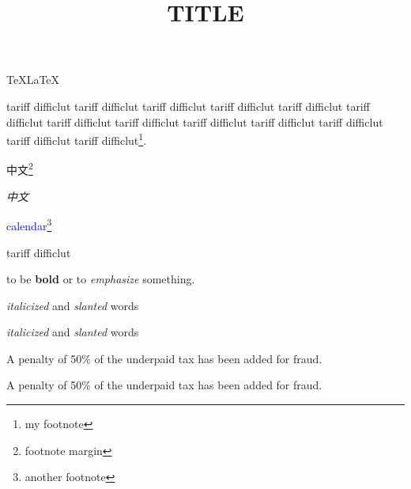 ﻿\documentclass[a4paper]{article}
\title{TITLE}
\author{}
\date{}
\begin{document}
\TeX \LaTeX

tariff difficlut tariff difficlut tariff difficlut tariff difficlut tariff difficlut tariff
difficlut tariff difficlut tariff difficlut tariff difficlut tariff difficlut tariff difficlut
tariff difficlut tariff difficlut\footnote{my footnote}.

中文\footnote{footnote margin}

{\it 中文}

\textcolor{blue}{calendar}\footnote{another footnote}

{\sf tariff difficlut}

to be {\bf bold} or to {\sl emphasize} something.

{\it italicized\/} and {\sl slanted\/} words

{\it italicized} and {\sl slanted} words

\def\cheater{A penalty of 50\% of the underpaid tax
has been added for fraud.\par}

\cheater\cheater
\end{document}
